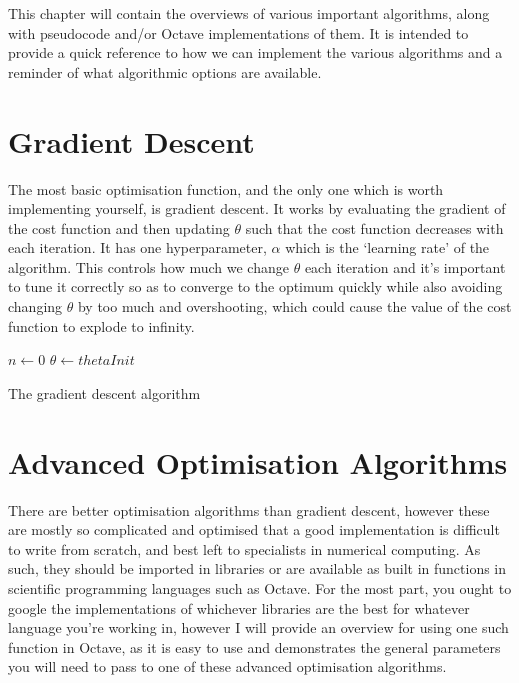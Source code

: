 This chapter will contain the overviews of various important algorithms, along with pseudocode and/or Octave implementations of them. It is intended to provide
a quick reference to how we can implement the various algorithms and a reminder of what algorithmic options are available.

\section{Gradient Descent}

The most basic optimisation function, and the only one which is worth implementing yourself, is gradient descent. It works by evaluating the gradient of the cost
function and then updating $\theta$ such that the cost function decreases with each iteration. It has one hyperparameter, $\alpha$ which is the `learning rate' of the
algorithm. This controls how much we change $\theta$ each iteration and it's important to tune it correctly so as to converge to the optimum quickly while also avoiding
changing $\theta$ by too much and overshooting, which could cause the value of the cost function to explode to infinity.

\vspace{1em}
\begin{algorithm}[H]
    \SetAlgoLined


    $n \gets 0$ \;
    $\theta \gets thetaInit$ \;
    \Return{$\theta$}

    \caption{The gradient descent algorithm}
\end{algorithm}

\section{Advanced Optimisation Algorithms}

There are better optimisation algorithms than gradient descent, however these are mostly so complicated and optimised that a good implementation is difficult
to write from scratch, and best left to specialists in numerical computing. As such, they should be imported in libraries or are available as built in functions
in scientific programming languages such as Octave. For the most part, you ought to google the implementations of whichever libraries are the best for whatever
language you're working in, however I will provide an overview for using one such function in Octave, as it is easy to use and demonstrates the general parameters
you will need to pass to one of these advanced optimisation algorithms.

